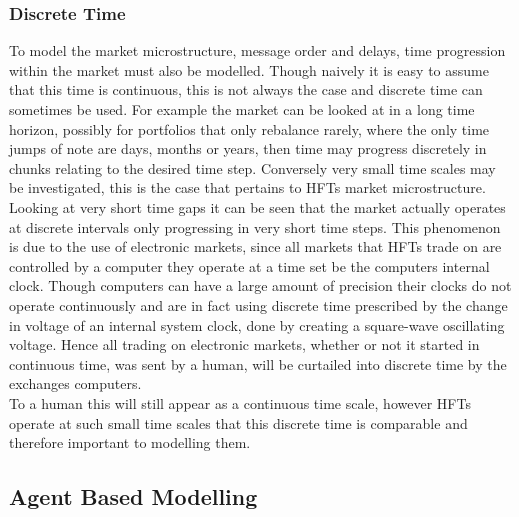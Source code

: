 \documentclass{article}
\begin{document}
\subsubsection{Discrete Time}

To model the market microstructure, message order and delays, time progression within the market must also be modelled. Though naively it is easy to assume that this time is continuous, this is not always the case and discrete time can sometimes be used. For example the market can be looked at in a long time horizon,  possibly for portfolios that only rebalance rarely, where the only time jumps of note are days, months or years, then time may progress discretely in chunks relating to the desired time step. Conversely very small time scales may be investigated, this is the case that pertains to HFTs market microstructure. Looking at very short time gaps it can be seen that the market actually operates at discrete intervals only progressing in very short time steps. This phenomenon is due to the use of electronic markets, since all markets that HFTs trade on are controlled by a computer they operate at a time set be the computers internal clock. Though computers can have a large amount of precision their clocks do not operate continuously and are in fact using discrete time prescribed by the change in voltage of an internal system clock, done by creating a square-wave oscillating voltage. Hence all trading on electronic markets, whether or not it started in continuous time, was sent by a human, will be curtailed into discrete time by the exchanges computers.\\
To a human this will still appear as a continuous time scale, however HFTs operate at such small time scales that this discrete time is comparable and therefore important to modelling them.          




\subsection{Agent Based Modelling}

\end{document}
